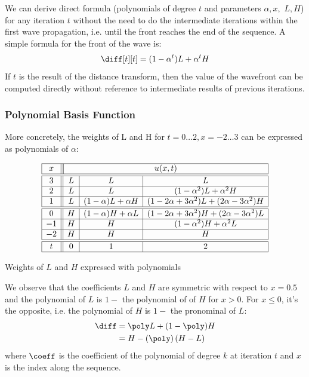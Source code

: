 We can derive direct formula (polynomials of degree $t$ and parameters $\alpha, x,$
$L, H$) for any iteration $t$ without the need to do the intermediate 
iterations within the first wave propagation, i.e. until the front reaches the end 
of the sequence. A simple formula for the front of the wave is:
%
\begin{equation}\label{eq:wavefront}
    \diff[t][t] = (1 - \alpha^t)L + \alpha^t H
\end{equation}
%
If $t$ is the result of the distance transform, then the value of the wavefront can be
computed directly without reference to intermediate results of previous iterations.

\subsubsection{Polynomial Basis Function}

More concretely, the weights of L and H for $t=0\ldots2,x=-2\ldots3$ can be expressed 
as polynomials of $\alpha$:

\begin{table}[h]
    \small
    \centering
    $$
        \begin{array}{|c||c|c|c|} \hline
         x & \multicolumn{3}{|c|}{u(x,t)} \\ \hline \hline
         3 & L &          L           &                     L                       \\ \hline
         2 & L &          L           &         (1-\alpha^2)L+\alpha^2H             \\ \hline
         1 & L & (1-\alpha)L+\alpha H & (1-2\alpha+3\alpha^2)L+(2\alpha-3\alpha^2)H \\ \hline \hline
         0 & H & (1-\alpha)H+\alpha L & (1-2\alpha+3\alpha^2)H+(2\alpha-3\alpha^2)L \\ \hline
        -1 & H &          H           &         (1-\alpha^2)H+\alpha^2L             \\ \hline
        -2 & H &          H           &                     H                       \\ \hline \hline
        t  & 0 &          1           &                     2                       \\ \hline
        \end{array}
    $$
    \caption{Weights of $L$ and $H$ expressed with polynomials}
    \label{tab:weight_poly}
\end{table}

We observe that the coefficients $L$ and $H$ are symmetric with respect to $x=0.5$ and 
the polynomial of $L$ is $1-$ the polynomial of of $H$ for $x>0$. For $x\le0$, it's the 
opposite, i.e. the polynomial of $H$ is $1-$ the pronominal of $L$:
%
\begin{equation}
    \begin{split}
        \diff & = \poly L + (1 - \poly) H \\
              & = H - \left(\poly \right) (H-L)
    \end{split}
    \label{eq:polynomial}
\end{equation}
%
where $\coeff$ is the coefficient of the polynomial of degree $k$ at iteration $t$ and
$x$ is the index along the sequence.

